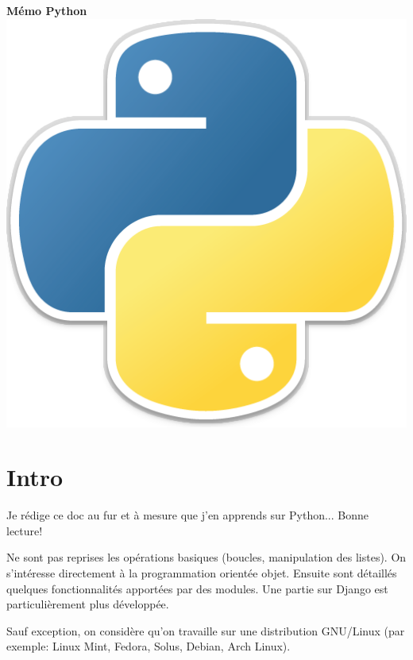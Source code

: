 \documentclass[a4paper, 10pt]{article}
\begin{document}

\begin{center}
        {\Huge{\sc\bfseries{Mémo Python}}}\\[20pt]
        \includegraphics[scale=0.1]{python.png}
        \vspace{20pt}
\end{center}

\tableofcontents

\hypersetup{linkcolor=blue}

\newpage
\section*{Intro}

Je rédige ce doc au fur et à mesure que j'en apprends sur Python... Bonne lecture!\bigskip

Ne sont pas reprises les opérations \og basiques \fg{} (boucles, manipulation des listes). On s'intéresse directement à la programmation orientée objet. Ensuite sont détaillés quelques fonctionnalités apportées par des modules. Une partie sur Django est particulièrement plus développée.\bigskip

Sauf exception, on considère qu'on travaille sur une distribution GNU/Linux (par exemple: Linux Mint, Fedora, Solus, Debian, Arch Linux).\bigskip
\end{document}

